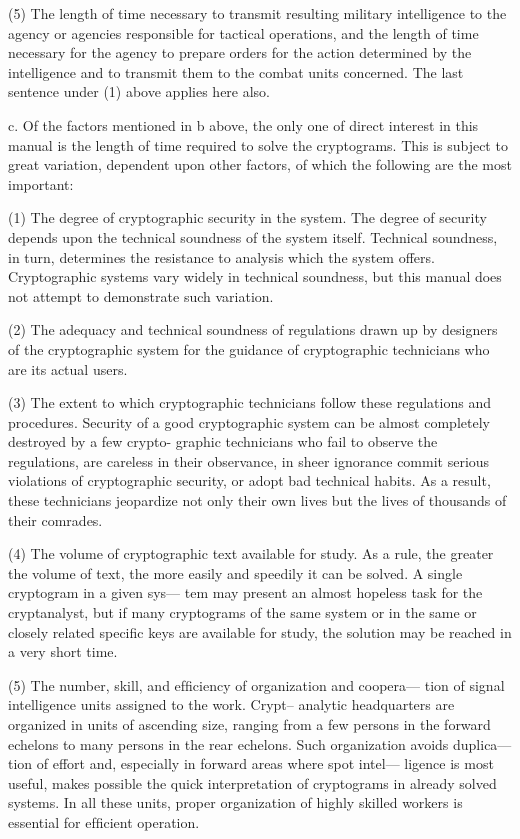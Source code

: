 (5) The length of time necessary to transmit resulting military
intelligence to the agency or agencies responsible for tactical
operations, and the length of time necessary for the agency to
prepare orders for the action determined by the intelligence and
to transmit them to the combat units concerned. The last
sentence under (1) above applies here also.

c. Of the factors mentioned in b above, the only one of direct interest
in this manual is the length of time required to solve the cryptograms.
This is subject to great variation, dependent upon other factors, of
which the following are the most important:

(1) The degree of cryptographic security in the system. The degree
of security depends upon the technical soundness of the system
itself. Technical soundness, in turn, determines the resistance
to analysis which the system offers. Cryptographic systems vary
widely in technical soundness, but this manual does not attempt
to demonstrate such variation.
 
(2) The adequacy and technical soundness of regulations drawn up
by designers of the cryptographic system for the guidance of
cryptographic technicians who are its actual users.

(3) The extent to which cryptographic technicians follow these
regulations and procedures. Security of a good cryptographic
system can be almost completely destroyed by a few crypto-
graphic technicians who fail to observe the regulations, are
careless in their observance, in sheer ignorance commit serious
violations of cryptographic security, or adopt bad technical
habits. As a result, these technicians jeopardize not only their
own lives but the lives of thousands of their comrades.

(4) The volume of cryptographic text available for study. As a
rule, the greater the volume of text, the more easily and
speedily it can be solved. A single cryptogram in a given sys—
tem may present an almost hopeless task for the cryptanalyst,
but if many cryptograms of the same system or in the same or
closely related speciﬁc keys are available for study, the solution
may be reached in a very short time.

(5) The number, skill, and efﬁciency of organization and coopera—
tion of signal intelligence units assigned to the work. Crypt--
analytic headquarters are organized in units of ascending size,
ranging from a few persons in the forward echelons to many
persons in the rear echelons. Such organization avoids duplica—
tion of effort and, especially in forward areas where spot intel—
ligence is most useful, makes possible the quick interpretation
of cryptograms in already solved systems. In all these units,
proper organization of highly skilled workers is essential for
efﬁcient operation.

